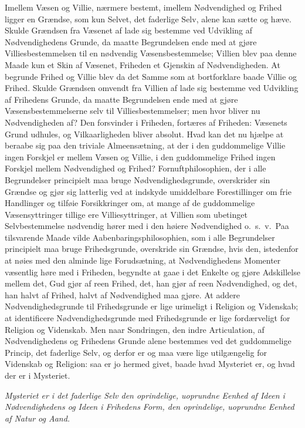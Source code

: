 \documentclass[12pt]{book}
\begin{document}
Imellem Væsen og Villie, nærmere bestemt, imellem Nødvendighed og
Frihed ligger en Grændse, som kun Selvet, det faderlige Selv, alene
kan sætte og hæve. Skulde Grændsen fra Væsenet af lade sig bestemme
ved Udvikling af Nødvendighedens Grunde, da maatte Begrundelsen ende
med at gjøre Villiesbestemmelsen til en nødvendig
Væsensbestemmelse; Villien blev paa denne Maade kun et Skin af
Væsenet, Friheden et Gjenskin af Nødvendigheden. At begrunde Frihed
og Villie blev da det Samme som at bortforklare baade Villie og
Frihed. Skulde Grændsen omvendt fra Villien af lade sig bestemme ved
Udvikling af Frihedens Grunde, da maatte Begrundelsen ende med at
gjøre Væsensbestemmelserne selv til Villiesbestemmelser; men hvor
bliver nu Nødvendigheden af? Den forsvinder i Friheden, fortæres af
Friheden: Væsenets Grund udhules, og Vilkaarligheden bliver absolut.
Hvad kan det nu hjælpe at beraabe sig paa den triviale
Almeensætning, at der i den guddommelige Villie ingen Forskjel er
mellem Væsen og Villie, i den guddommelige Frihed ingen Forskjel
mellem Nødvendighed og Frihed? Fornuftphilosophien, der i alle
Begrundelser principielt maa bruge Nødvendighedsgrunde, overskrider
sin Grændse og gjør sig latterlig ved at indskyde umiddelbare
Forestillinger om frie Handlinger og tilføie Forsikkringer om, at
mange af de guddommelige Væsensyttringer tillige ere
Villiesyttringer, at Villien som ubetinget Selvbestemmelse nødvendig
hører med i den høiere Nødvendighed o.\ s.\ v.\ Paa tilsvarende
Maade vilde Aabenbaringsphilosophien, som i alle Begrundelser
principielt maa bruge Frihedsgrunde, overskride sin Grændse, hvis
den, istedenfor at nøies med den alminde\-
lige Forudsætning, at Nødvendighedens Momenter væsentlig høre med i
Friheden, begyndte at gaae i det Enkelte og gjøre Adskillelse mellem
det, Gud gjør af reen Frihed, det, han gjør af reen Nødvendighed,
og det, han halvt af Frihed, halvt af Nødvendighed maa gjøre. At
addere Nødvendighedsgrunde til Frihedsgrunde er lige urimeligt i
Religion og Videnskab; at identificere Nødvendighedsgrunde med
Frihedsgrunde er lige fordærveligt for Religion og Videnskab. Men
naar Sondringen, den indre Articulation, af Nødvendighedens og
Frihedens Grunde alene bestemmes ved det guddommelige Princip, det
faderlige Selv, og derfor er og maa være lige utilgængelig for
Videnskab og Religion: saa er jo hermed givet, baade hvad Mysteriet
er, og hvad der er i Mysteriet.

\emph{Mysteriet er i det faderlige Selv den oprindelige, uoprundne
Eenhed af Ideen i Nødvendighedens og Ideen i Frihedens Form, den
oprindelige, uoprundne Eenhed af Natur og Aand.}
\end{document}
